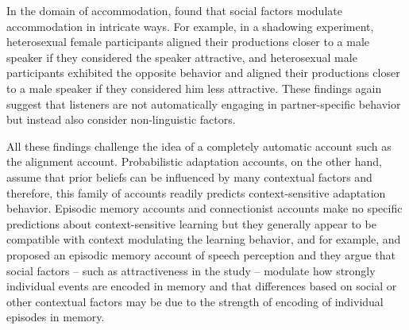 In the domain of accommodation, \textcite{Babel2012} found that social factors modulate accommodation in intricate ways. For example, in a shadowing experiment, heterosexual female
participants aligned their productions closer to a male speaker if they considered the speaker attractive, and heterosexual male participants exhibited the opposite behavior
and aligned their productions closer to a male speaker if they considered him less attractive. These findings again suggest that listeners are not automatically engaging
in partner-specific behavior but instead also consider non-linguistic factors.  


All these findings challenge the idea of a completely automatic account such as the alignment account. Probabilistic adaptation accounts, on the other hand, assume
that prior beliefs can be influenced by many contextual factors and therefore, this family of accounts readily predicts context-sensitive adaptation behavior.
Episodic memory accounts and connectionist accounts make no specific predictions about context-sensitive learning but they generally appear to be compatible with context
modulating the learning behavior, and for example, \textcite{Sumner2013} and \textcite{Sumner2014} proposed an episodic memory account of speech perception and they argue
 that social factors -- such as attractiveness in the \textcite{Babel2012}  study -- modulate how strongly individual events are encoded in memory and that differences based on social
 or other contextual factors may be due to the strength of encoding of individual episodes in memory.
 
